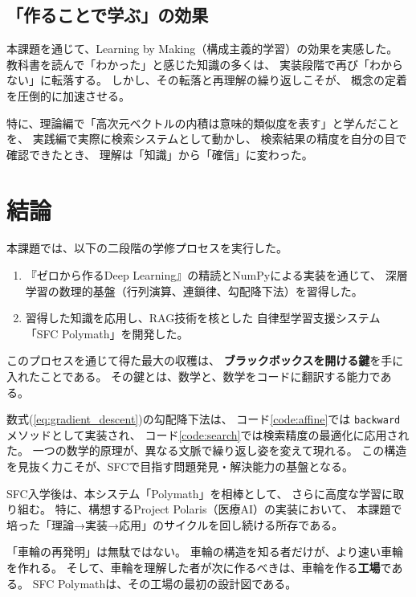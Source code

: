 \documentclass[uplatex, dvipdfmx, a4paper, 11pt]{jsarticle}
\begin{document}
\subsection{「作ることで学ぶ」の効果}
本課題を通じて、Learning by Making（構成主義的学習）の効果を実感した。
教科書を読んで「わかった」と感じた知識の多くは、
実装段階で再び「わからない」に転落する。
しかし、その転落と再理解の繰り返しこそが、
概念の定着を圧倒的に加速させる。

特に、理論編で「高次元ベクトルの内積は意味的類似度を表す」と学んだことを、
実践編で実際に検索システムとして動かし、
検索結果の精度を自分の目で確認できたとき、
理解は「知識」から「確信」に変わった。


\section{結論}

本課題では、以下の二段階の学修プロセスを実行した。

\begin{enumerate}
    \item 『ゼロから作るDeep Learning』の精読とNumPyによる実装を通じて、
          深層学習の数理的基盤（行列演算、連鎖律、勾配降下法）を習得した。
    \item 習得した知識を応用し、RAG技術を核とした
          自律型学習支援システム「SFC Polymath」を開発した。
\end{enumerate}

このプロセスを通じて得た最大の収穫は、
\textbf{ブラックボックスを開ける鍵}を手に入れたことである。
その鍵とは、数学と、数学をコードに翻訳する能力である。

数式(\ref{eq:gradient_descent})の勾配降下法は、
コード\ref{code:affine}では \texttt{backward} メソッドとして実装され、
コード\ref{code:search}では検索精度の最適化に応用された。
一つの数学的原理が、異なる文脈で繰り返し姿を変えて現れる。
この構造を見抜く力こそが、SFCで目指す問題発見・解決能力の基盤となる。

SFC入学後は、本システム「Polymath」を相棒として、
さらに高度な学習に取り組む。
特に、構想するProject Polaris（医療AI）の実装において、
本課題で培った「理論→実装→応用」のサイクルを回し続ける所存である。

「車輪の再発明」は無駄ではない。
車輪の構造を知る者だけが、より速い車輪を作れる。
そして、車輪を理解した者が次に作るべきは、車輪を作る\textbf{工場}である。
SFC Polymathは、その工場の最初の設計図である。
\end{document}
